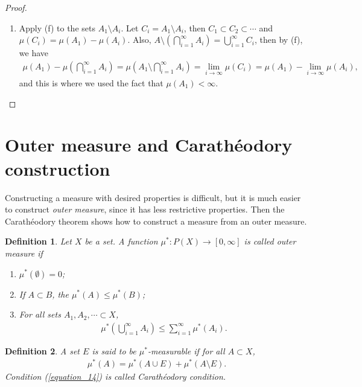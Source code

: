 \documentclass[11pt]{book}
\newtheorem{definition}{Definition}[chapter]
\theoremstyle{definition}
\numberwithin{equation}{chapter}
\begin{document}
\begin{proof}
\begin{enumerate}[label=(\alph*)]
    \item Apply (f) to the sets $A_1\setminus A_i$. Let $C_i = A_1 \setminus A_i$, then $C_1 \subset C_2 \subset \cdots$ and $\mu(C_i) = \mu(A_1) - \mu(A_i)$. Also, $A \setminus \left( \bigcap^\infty_{i=1} A_i\right) = \bigcup^\infty_{i=1} C_i$, then by (f), we have
    \begin{align*}
        \mu(A_1) - \mu \left(\bigcap^\infty_{i=1} A_i\right) = \mu\left(A_1 \setminus \bigcap^\infty_{i=1} A_i\right) = \lim_{i\to\infty} \mu(C_i) = \mu(A_1) - \lim_{i\to\infty} \mu(A_i),
    \end{align*}
    and this is where we used the fact that $\mu(A_1) < \infty$.
\end{enumerate}
\end{proof}

\medskip

\section{Outer measure and Carathéodory construction}

Constructing a measure with desired properties is difficult, but it is much easier to construct {\em outer measure}, since it has less restrictive properties. Then the Carathéodory theorem shows how to construct a measure from an outer measure.

\medskip

\begin{definition}
Let $X$ be a set. A function $\mu^*: P(X) \to [0,\infty]$ is called outer measure if 
\begin{enumerate}[label=(\alph*)]
    \item $\mu^*(\emptyset) = 0$;
    
    \item If $A \subset B$, the $\mu^*(A) \leq \mu^*(B)$;
    
    \item For all sets $A_1, A_2, \cdots \subset X$,
    \begin{align*}
        \mu^* \left( \bigcup^\infty_{i=1} A_i \right) \leq \sum^\infty_{i=1} \mu^*(A_i).
    \end{align*}
\end{enumerate}
\end{definition}

\medskip

\begin{definition}
A set $E$ is said to be $\mu^*$-measurable if for all $A \subset X$,
\begin{align}\label{equation_14}
    \mu^*(A) = \mu^*(A \cup E) + \mu^*(A \setminus E).
\end{align}
Condition (\ref{equation_14}) is called Carathéodory condition.
\end{definition}
\end{document}
